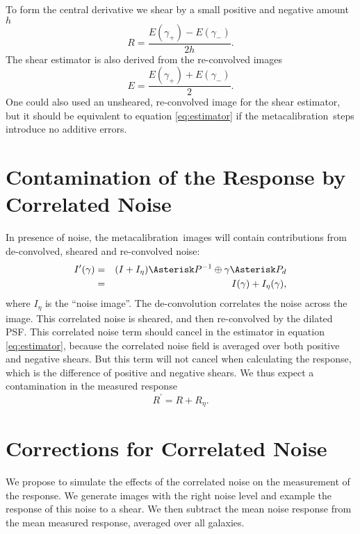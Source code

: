 \documentclass[usegraphicx,usenatbib]{mn2e}
\newcommand{\mcal}{metacalibration}
\begin{document}
To form the central derivative we shear by a small positive and negative
amount $h$
\begin{equation} \label{eq:Rnum}
    R = \frac{E(\gamma_+) - E(\gamma_-)}{2 h}.
\end{equation}
The shear estimator is also derived from the re-convolved
images
\begin{equation} \label{eq:estimator}
    E = \frac{E(\gamma_+) + E(\gamma_-)}{2}.
\end{equation}
One could also used an unsheared, re-convolved image for the
shear estimator, but it should be
equivalent to equation \ref{eq:estimator} if the \mcal\ steps
introduce no additive errors.

\section{Contamination of the Response by Correlated Noise} \label{sec:contam}

In presence of noise, the \mcal\ images will contain
contributions from de-convolved, sheared and re-convolved noise:
\begin{eqnarray}
    I^{\prime}(\gamma) & = & (I + I_\eta) \Asterisk P^{-1} \oplus \gamma \Asterisk P_{d} \nonumber \\
    & = & I(\gamma) + I_\eta(\gamma),
\end{eqnarray}
where $I_\eta$ is the ``noise image''.  The de-convolution correlates the noise
across the image.  This correlated noise is sheared, and then re-convolved by
the dilated PSF.  This correlated noise term should cancel in the estimator in
equation \ref{eq:estimator}, because the correlated noise field is averaged
over both positive and negative shears.  But this term will not cancel when
calculating the response, which is the difference of positive and negative
shears.  We thus expect a contamination in the measured response
\begin{equation}
    R^{\prime}  =  R + R_{\eta}.
\end{equation}

\section{Corrections for Correlated Noise} \label{sec:corr}

We propose to simulate the effects of the correlated noise on the measurement
of the response.  We generate images with the right noise level and example
the response of this noise to a shear.  We then subtract the mean noise
response from the mean measured response, averaged over all galaxies.
\end{document}
